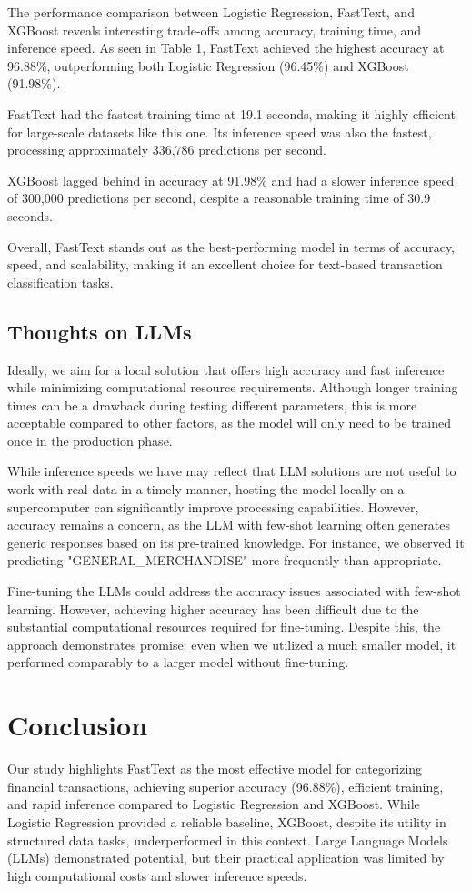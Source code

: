\documentclass[12pt,letterpaper]{article}
\begin{document}
The performance comparison between Logistic Regression, FastText, and XGBoost reveals interesting trade-offs among accuracy, training time, and inference speed. As seen in Table 1, FastText achieved the highest accuracy at 96.88\%, outperforming both Logistic Regression (96.45\%) and XGBoost (91.98\%).

FastText had the fastest training time at 19.1 seconds, making it highly efficient for large-scale datasets like this one. Its inference speed was also the fastest, processing approximately 336,786 predictions per second.

XGBoost lagged behind in accuracy at 91.98\% and had a slower inference speed of 300,000 predictions per second, despite a reasonable training time of 30.9 seconds.

Overall, FastText stands out as the best-performing model in terms of accuracy, speed, and scalability, making it an excellent choice for text-based transaction classification tasks.


\subsection{Thoughts on LLMs}

Ideally, we aim for a local solution that offers high accuracy and fast inference while minimizing computational resource requirements. Although longer training times can be a drawback during testing different parameters, this is more acceptable compared to other factors, as the model will only need to be trained once in the production phase.

 While inference speeds we have may reflect that LLM solutions are not useful to work with real data in a timely manner, hosting the model locally on a supercomputer can significantly improve processing capabilities. However, accuracy remains a concern, as the LLM with few-shot learning often generates generic responses based on its pre-trained knowledge. For instance, we observed it predicting "GENERAL\_MERCHANDISE" more frequently than appropriate.
 
Fine-tuning the LLMs could address the accuracy issues associated with few-shot learning. However, achieving higher accuracy has been difficult due to the substantial computational resources required for fine-tuning. Despite this, the approach demonstrates promise: even when we utilized a much smaller model, it performed comparably to a larger model without fine-tuning.


\section{Conclusion}
Our study highlights FastText as the most effective model for categorizing financial transactions, achieving superior accuracy (96.88\%), efficient training, and rapid inference compared to Logistic Regression and XGBoost. While Logistic Regression provided a reliable baseline, XGBoost, despite its utility in structured data tasks, underperformed in this context. Large Language Models (LLMs) demonstrated potential, but their practical application was limited by high computational costs and slower inference speeds.  
\end{document}
